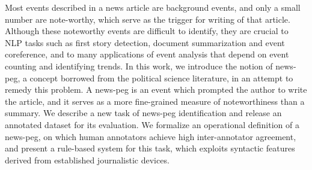 Most events described in a news article are background events, and only a small number are note-worthy, which serve as the trigger for writing of that article. Although these noteworthy events are difficult to identify, they are crucial to NLP tasks such as first story detection, document summarization and event coreference, and to many applications of event analysis that depend on event counting and identifying trends. In this work, we introduce the notion of news-peg, a concept borrowed from the political science literature, in an attempt to remedy this problem. A news-peg is an event which prompted the author to write the article, and it serves as a more fine-grained measure of noteworthiness than a summary. We describe a new task of news-peg identification and release an annotated dataset for its evaluation. We formalize an operational definition of a news-peg, on which human annotators achieve high inter-annotator agreement, and present a rule-based system for this task, which exploits syntactic features derived from established journalistic devices.
